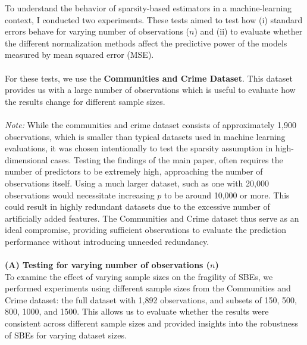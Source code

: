 To understand the behavior of sparsity-based estimators in a machine-learning context, I conducted two experiments. These tests aimed to test how (i) standard errors behave for varying number of observations ($n$) and (ii) to evaluate whether the different normalization methods affect the predictive power of the models measured by mean squared error (MSE). \\
\\
For these tests, we use the \textbf{Communities and Crime Dataset}. This dataset provides us with a large number of observations which is useful to evaluate how the results change for different sample sizes.\\
\\
\textit{Note:} While the communities and crime dataset consists of approximately 1,900 observations, which is smaller than typical datasets used in machine learning evaluations,
it was chosen intentionally to test the sparsity assumption in high-dimensional cases.
Testing the findings of the main paper, often requires the number of predictors to be extremely high, approaching the number of observations itself. Using a much larger dataset, such as one with 20,000 observations would necessitate increasing $p$ to be around 10,000 or more. This could result in highly redundant datasets due to the excessive number of artificially added features. The Communities and Crime dataset thus serve as an ideal compromise, providing sufficient observations to evaluate the prediction performance without introducing unneeded redundancy.\\
\\
\textbf{(A) Testing for varying number of observations ($n$)}\\
To examine the effect of varying sample sizes on the fragility of SBEs, we
performed experiments using different sample sizes from the Communities
and Crime dataset: the full dataset with 1,892 observations, and subsets of 150, 500, 800, 1000, and 1500. This allows us to evaluate whether the results were consistent across different sample sizes and provided insights into the robustness of SBEs for
varying dataset sizes. \\
